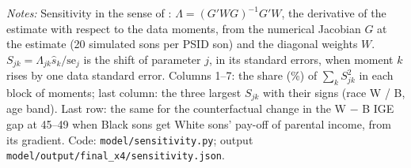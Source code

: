 \begin{table}[!htbp]
\centering
\caption{Which moments identify the race parameters: sensitivity of the estimates (model E)}
\label{tab:modelsens}
\par\smallskip
\begin{minipage}{\textwidth}\footnotesize \textit{Notes:} Sensitivity in the sense of \citet{andrews2017measuring}: $\Lambda = (G'WG)^{-1}G'W$, the derivative of the estimate with respect to the data moments, from the numerical Jacobian $G$ at the estimate (20 simulated sons per PSID son) and the diagonal weights $W$. $S_{jk} = \Lambda_{jk}\hat s_k / \mathrm{se}_j$ is the shift of parameter $j$, in its standard errors, when moment $k$ rises by one data standard error. Columns 1--7: the share (\%) of $\sum_k S_{jk}^2$ in each block of moments; last column: the three largest $S_{jk}$ with their signs (race W / B, age band). Last row: the same for the counterfactual change in the W $-$ B IGE gap at 45--49 when Black sons get White sons' pay-off of parental income, from its gradient. Code: \texttt{model/sensitivity.py}; output \texttt{model/output/final\_x4/sensitivity.json}.\end{minipage}
\end{table}
